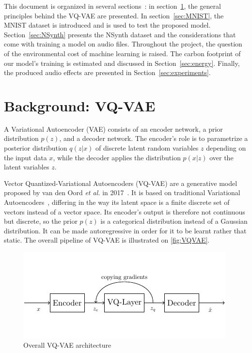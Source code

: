 \documentclass{article}
\begin{document}
This document is organized in several sections~: in section~\ref{sec:background}, the general principles behind the VQ-VAE are presented. In section~\ref{sec:MNIST}, the MNIST dataset is introduced and is used to test the proposed model. Section~\ref{sec:NSynth} presents the NSynth dataset and the considerations that come with training a model on audio files. Throughout the project, the question of the environmental cost of machine learning is raised. The carbon footprint of our model's training is estimated and discussed in Section~\ref{sec:energy}. Finally, the produced audio effects are presented in Section~\ref{sec:experiments}.

\section{Background: VQ-VAE}\label{sec:background}

A Variational Autoencoder (VAE) consists of an encoder network, a prior distribution $p(z)$, and a decoder network. The encoder's role is to parametrize a posterior distribution $q(z|x)$ of discrete latent random variables $z$ depending on the input data $x$, while the decoder applies the distribution $p(x|z)$ over the latent variables $z$.

Vector Quantized-Variational Autoencoders (VQ-VAE) are a generative model proposed by van den Oord \emph{et al.} in 2017~\cite{VQVAE}. It is based on traditional Variational Autoencoders~\cite{VAE}, differing in the way its latent space is a finite discrete set of vectors instead of a vector space. Its encoder's output is therefore not continuous but discrete, so the prior $p(z)$ is a categorical distribution instead of a Gaussian distribution. It can be made autoregressive in order for it to be learnt rather that static. The overall pipeline of VQ-VAE is illustrated on \autoref{fig:VQVAE}.

\begin{figure}[ht]
    \centerline{\includegraphics[width=\columnwidth]{figs/VQVAE.pdf}}
    \caption{Overall VQ-VAE architecture}
    \label{fig:VQVAE}
\end{figure}
\end{document}
